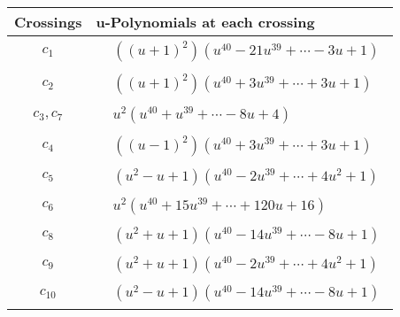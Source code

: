 \documentclass[1p]{elsarticle_modified}
\theoremstyle{definition}
\begin{document}
\begin{tabular}{m{50pt}|m{274pt}}
Crossings & \hspace{64pt}u-Polynomials at each crossing \\
\hline $$\begin{aligned}c_{1}\end{aligned}$$&$\begin{aligned}
&((u+1)^2)(u^{40}-21 u^{39}+\cdots-3 u+1)
\end{aligned}$\\
\hline $$\begin{aligned}c_{2}\end{aligned}$$&$\begin{aligned}
&((u+1)^2)(u^{40}+3 u^{39}+\cdots+3 u+1)
\end{aligned}$\\
\hline $$\begin{aligned}c_{3},c_{7}\end{aligned}$$&$\begin{aligned}
&u^2(u^{40}+u^{39}+\cdots-8 u+4)
\end{aligned}$\\
\hline $$\begin{aligned}c_{4}\end{aligned}$$&$\begin{aligned}
&((u-1)^2)(u^{40}+3 u^{39}+\cdots+3 u+1)
\end{aligned}$\\
\hline $$\begin{aligned}c_{5}\end{aligned}$$&$\begin{aligned}
&(u^2- u+1)(u^{40}-2 u^{39}+\cdots+4 u^2+1)
\end{aligned}$\\
\hline $$\begin{aligned}c_{6}\end{aligned}$$&$\begin{aligned}
&u^2(u^{40}+15 u^{39}+\cdots+120 u+16)
\end{aligned}$\\
\hline $$\begin{aligned}c_{8}\end{aligned}$$&$\begin{aligned}
&(u^2+u+1)(u^{40}-14 u^{39}+\cdots-8 u+1)
\end{aligned}$\\
\hline $$\begin{aligned}c_{9}\end{aligned}$$&$\begin{aligned}
&(u^2+u+1)(u^{40}-2 u^{39}+\cdots+4 u^2+1)
\end{aligned}$\\
\hline $$\begin{aligned}c_{10}\end{aligned}$$&$\begin{aligned}
&(u^2- u+1)(u^{40}-14 u^{39}+\cdots-8 u+1)
\end{aligned}$\\
\hline
\end{tabular}\newpage\renewcommand{\arraystretch}{1}
\end{document}
